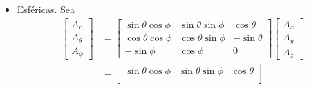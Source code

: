\begin{problema}
\begin{enumerate}
\begin{sol}
\begin{itemize}
\begin{align*}
\begin{bmatrix}
                        -\sin \phi(xy^2z) + \cos\phi(x^2yz) + 0(xyz^2)\\
                        0(xy^2z)+0(x^2yz)+1(xyz^2)
                    \end{bmatrix}= \begin{bmatrix}
                        \cos\phi(xy^2z)+ \sin \phi(x^2yz) \\
                        -\sin \phi(xy^2z) + \cos\phi(x^2yz) \\
                        xyz^2
                    \end{bmatrix}\\
                    &= \begin{bmatrix}
                        \cos\phi((\rho\cos\phi)(\rho\sin\phi)^2z)+ \sin \phi((\rho\cos\phi)^2(\rho\sin \phi)z) \\
                        -\sin \phi((\rho\cos\phi)(\rho\sin\phi)^2z)+ \cos\phi((\rho\cos\phi)^2(\rho\sin \phi)z) \\
                        (\rho \cos\phi)(\rho\sin\phi)z^2
                    \end{bmatrix}
                \end{align*}
                \item Esféricas. Sea 
                \begin{align*}
                    \begin{bmatrix}
                        A_r\\
                        A_\theta\\
                        A_\phi
                    \end{bmatrix} &= \begin{bmatrix}
                        \sin\theta\cos\phi & \sin\theta\sin\phi & \cos\theta\\
                        \cos \theta \cos\phi & \cos\theta \sin\phi & -\sin\theta\\
                        -\sin \phi & \cos\phi & 0
                    \end{bmatrix}\begin{bmatrix}
                        A_x\\
                        A_y\\
                        A_z
                    \end{bmatrix}\\
                    &= \begin{bmatrix}
                        \sin\theta\cos\phi & \sin\theta\sin\phi & \cos\theta\\

\end{bmatrix}
\end{align*}
\end{itemize}
\end{sol}
\end{enumerate}
\end{problema}
